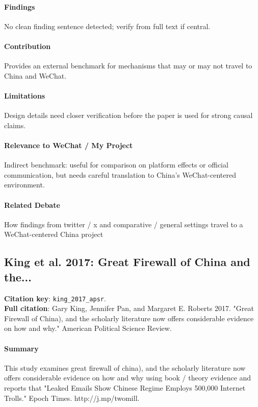 \documentclass[12pt]{article}
\begin{document}
\paragraph{Findings} No clean finding sentence detected; verify from full text if central.

\paragraph{Contribution} Provides an external benchmark for mechanisms that may or may not travel to China and WeChat.

\paragraph{Limitations} Design details need closer verification before the paper is used for strong causal claims.

\paragraph{Relevance to WeChat / My Project} Indirect benchmark: useful for comparison on platform effects or official communication, but needs careful translation to China's WeChat-centered environment.

\paragraph{Related Debate} How findings from twitter / x and comparative / general settings travel to a WeChat-centered China project


\subsection{King et al. 2017: Great Firewall of China and the...}
\textbf{Citation key}: \texttt{king\_2017\_apsr}.\\
\textbf{Full citation}: Gary King, Jennifer Pan, and Margaret E. Roberts 2017. "Great Firewall of China), and the scholarly literature now offers considerable evidence on how and why." American Political Science Review.

\paragraph{Summary} This study examines great firewall of china), and the scholarly literature now offers considerable evidence on how and why using book / theory evidence and reports that "Leaked Emails Show Chinese Regime Employs 500,000 Internet Trolls." Epoch Times. http://j.mp/twomill.
\end{document}
